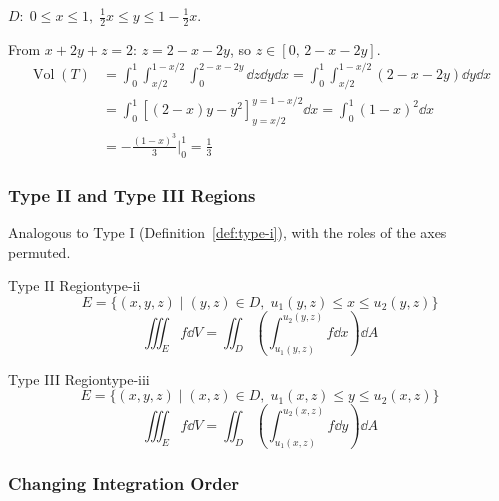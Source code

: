 \begin{example}
  $D\colon\; 0\leq x\leq 1,\; \tfrac{1}{2}x \leq y \leq 1 - \tfrac{1}{2}x$.

  From $x + 2y + z = 2$: $z = 2 - x - 2y$, so $z \in [0,\, 2 - x - 2y]$.
  \begin{align*}
    \operatorname{Vol}(T)
     & = \int_0^1\!\int_{x/2}^{1-x/2}\!\int_0^{2-x-2y} \dd{z}\dd{y}\dd{x}
    = \int_0^1\!\int_{x/2}^{1-x/2} (2-x-2y)\dd{y}\dd{x}                   \\
     & = \int_0^1 \left[(2-x)y - y^2\right]_{y=x/2}^{y=1-x/2}\dd{x}
    = \int_0^1 (1-x)^2\dd{x}                                              \\
     & = -\frac{(1-x)^3}{3}\bigg|_0^1
    = \frac{1}{3}
  \end{align*}
\end{example}

\subsubsection{Type II and Type III Regions}

Analogous to Type I (Definition~\ref{def:type-i}), with the roles of the axes permuted.

\begin{definition}{Type II Region}{type-ii}
  \[
    E = \{(x,y,z) \mid (y,z)\in D,\; u_1(y,z)\leq x\leq u_2(y,z)\}
  \]
  \[
    \iiint_E f\dd{V}
    = \iint_D\!\left(\int_{u_1(y,z)}^{u_2(y,z)} f\dd{x}\right)\dd{A}
  \]
\end{definition}

\begin{definition}{Type III Region}{type-iii}
  \[
    E = \{(x,y,z) \mid (x,z)\in D,\; u_1(x,z)\leq y\leq u_2(x,z)\}
  \]
  \[
    \iiint_E f\dd{V}
    = \iint_D\!\left(\int_{u_1(x,z)}^{u_2(x,z)} f\dd{y}\right)\dd{A}
  \]
\end{definition}

\subsubsection{Changing Integration Order}

